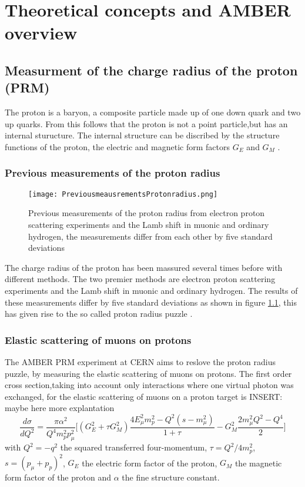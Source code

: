 \chapter{Theoretical concepts and AMBER overview}\label{cha:theory}


\section{Measurment of the charge radius of the proton (PRM)}\label{sec:proton_radius}
The proton is a baryon, a composite particle made up of one down quark and  two up quarks.
From this follows that the proton is not a point particle,but has an internal sturucture.
\newline
The internal structure can be discribed by the structure functions of the proton, 
the electric and magnetic form factors $G_E$ and $G_M$ \autocite{ProposalAmber}.	
\subsection{Previous measurements of the proton radius}
\begin{figure}[H]
	\centering
	\texttt{[image: PreviousmeausrementsProtonradius.png]}
	\caption{Previous measurements of the proton radius from electron proton  scattering experiments and the Lamb shift in muonic and ordinary hydrogen,
	 the measurements differ from each other by five standard deviations \autocite{ProposalAmber} }
	\label{fig:previous_proton_radius}
\end{figure}

The charge radius of the proton has been massured several times before with different methods.
The two premier methods are electron proton scattering experiments and the Lamb shift in muonic and ordinary hydrogen.
The results of these measurements differ by five standard deviations as shown in figure \ref{fig:previous_proton_radius},
this has given rise to the so called proton radius puzzle \autocite{ProposalAmber}.






\subsection{Elastic scattering of muons on protons}
The AMBER PRM experiment at CERN aims to reslove the proton radius puzzle, by measuring the elastic scattering of muons on protons.
The first order cross section,taking into account only interactions where one virtual photon was exchanged, 
for the elastic scattering of muons on a proton target is \autocite{intentAmber}
INSERT: maybe  here more explantation 
\begin{equation}
\label{eq:cross_section}
\frac{d\sigma}{dQ^2} = \frac{\pi \alpha^2}{Q^4 m_p^2 p_\mu^2} \bigg[ \left( G_E^2 + \tau G_M^2 \right) \frac{ 4E_\mu^2 m_p^2 
- Q^2 (s - m_\mu^2)}{1 + \tau }  - G_M^2 \frac{ 2m_\mu^2 Q^2 - Q^4}{2} \bigg]
\end{equation}
with  $Q^2 = -q^2$ 	the squared transferred four-momentum, $\tau = Q^2 / 4m_p^2$, $s = (p_\mu + p_p)^2$, 
 $G_E$ the electric form factor of the proton,
  $G_M$ the magnetic form factor of the proton and $\alpha$ the fine structure constant.
  
